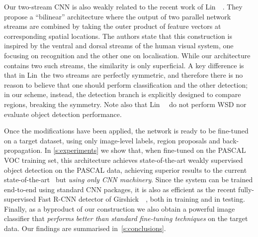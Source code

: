 Our two-stream CNN is also weakly related to the recent work of Lin~\etal~\cite{Lin15}. They propose a ``bilinear'' architecture where the output of two parallel network streams are combined by taking the outer product of feature vectors at corresponding spatial locations. The authors state that this construction is inspired by the ventral and dorsal streams of the human visual system, one focusing on recognition and the other one on localisation. While our architecture contains two such streams, the similarity is only superficial. A key difference is that in Lin~\etal the two streams are perfectly symmetric, and therefore there is no reason to believe that one should perform classification and the other detection; in our scheme, instead, the detection branch is explicitly designed to compare regions, breaking the symmetry. Note also that Lin~\etal~\cite{Lin15} do not perform WSD nor evaluate object detection performance.

Once the modifications have been applied, the network is ready to be fine-tuned on a target dataset, using only image-level labels, region proposals and back-propagation. In \cref{s:experiments} we show that, when fine-tuned on the PASCAL VOC training set, this architecture achieves state-of-the-art weakly supervised object detection on the PASCAL data, achieving superior results to the current state-of-the-art~\cite{Wang14a} but \emph{using only CNN machinery}. Since the system can be trained end-to-end using standard CNN packages, it is also as efficient as the recent fully-supervised Fast R-CNN detector of Girshick~\etal~\cite{Girshick15}, both in training and in testing. Finally, as a byproduct of our construction we also obtain a powerful image classifier that \emph{performs better than standard fine-tuning techniques} on the target data. Our findings are summarised in~\cref{s:conclusions}.
